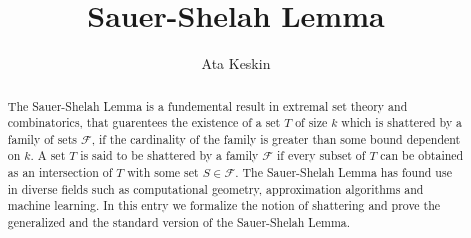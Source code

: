 \documentclass[11pt,a4paper]{article}
\begin{document}
\title{Sauer-Shelah Lemma}
\author{Ata Keskin}
\maketitle

\begin{abstract}
	The Sauer-Shelah Lemma is a fundemental result in extremal set theory and combinatorics, that guarentees the existence of a set $T$ of size $k$
	which is shattered by a family of sets $\mathcal{F}$, if the cardinality of the family is greater than some bound dependent on $k$. A set $T$ is
	said to be shattered by a family $\mathcal{F}$ if every subset of $T$ can be obtained as an intersection of $T$ with some set $S \in \mathcal{F}$.
	The Sauer-Shelah Lemma has found use in diverse fields such as computational geometry, approximation algorithms and machine learning. In this entry
	we formalize the notion of shattering and prove the generalized and the standard version of the Sauer-Shelah Lemma. 
\end{abstract}

\tableofcontents





\end{document}
